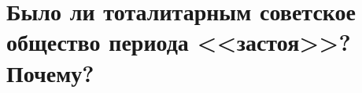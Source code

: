 \documentclass[12pt]{article}
\begin{document}
  \section{Было ли тоталитарным советское общество периода <<застоя>>? Почему?}
\end{document}
